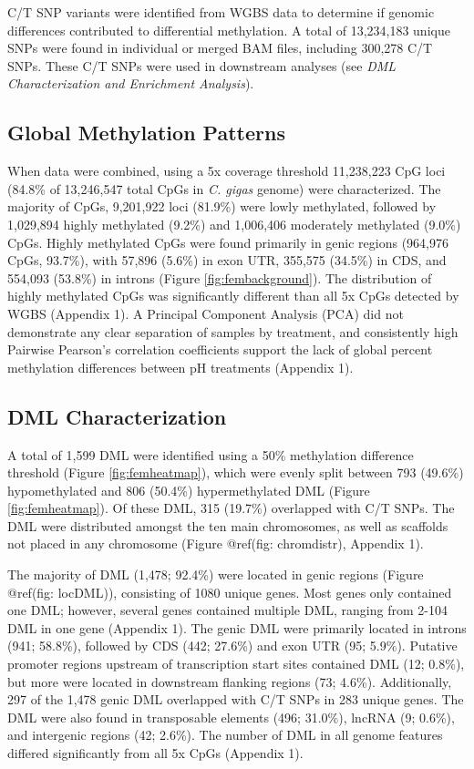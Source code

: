 \documentclass [11pt, proquest] {uwthesis}[2015/03/03]
\begin{document}
C/T SNP variants were identified from WGBS data to determine if genomic differences contributed to differential methylation. A total of 13,234,183 unique SNPs were found in individual or merged BAM files, including 300,278 C/T SNPs. These C/T SNPs were used in downstream analyses (see \emph{DML Characterization and Enrichment Analysis}).

\hypertarget{global-methylation-patterns}{%
\subsection{Global Methylation Patterns}\label{global-methylation-patterns}}

When data were combined, using a 5x coverage threshold 11,238,223 CpG loci (84.8\% of 13,246,547 total CpGs in \emph{C. gigas} genome) were characterized. The majority of CpGs, 9,201,922 loci (81.9\%) were lowly methylated, followed by 1,029,894 highly methylated (9.2\%) and 1,006,406 moderately methylated (9.0\%) CpGs. Highly methylated CpGs were found primarily in genic regions (964,976 CpGs, 93.7\%), with 57,896 (5.6\%) in exon UTR, 355,575 (34.5\%) in CDS, and 554,093 (53.8\%) in introns (Figure \ref{fig:fembackground}). The distribution of highly methylated CpGs was significantly different than all 5x CpGs detected by WGBS (Appendix 1). A Principal Component Analysis (PCA) did not demonstrate any clear separation of samples by treatment, and consistently high Pairwise Pearson's correlation coefficients support the lack of global percent methylation differences between pH treatments (Appendix 1).

\hypertarget{dml-characterization-1}{%
\subsection{DML Characterization}\label{dml-characterization-1}}

A total of 1,599 DML were identified using a 50\% methylation difference threshold (Figure \ref{fig:femheatmap}), which were evenly split between 793 (49.6\%) hypomethylated and 806 (50.4\%) hypermethylated DML (Figure \ref{fig:femheatmap}). Of these DML, 315 (19.7\%) overlapped with C/T SNPs. The DML were distributed amongst the ten main chromosomes, as well as scaffolds not placed in any chromosome (Figure @ref(fig: chromdistr), Appendix 1).

The majority of DML (1,478; 92.4\%) were located in genic regions (Figure @ref(fig: locDML)), consisting of 1080 unique genes. Most genes only contained one DML; however, several genes contained multiple DML, ranging from 2-104 DML in one gene (Appendix 1). The genic DML were primarily located in introns (941; 58.8\%), followed by CDS (442; 27.6\%) and exon UTR (95; 5.9\%). Putative promoter regions upstream of transcription start sites contained DML (12; 0.8\%), but more were located in downstream flanking regions (73; 4.6\%). Additionally, 297 of the 1,478 genic DML overlapped with C/T SNPs in 283 unique genes. The DML were also found in transposable elements (496; 31.0\%), lncRNA (9; 0.6\%), and intergenic regions (42; 2.6\%). The number of DML in all genome features differed significantly from all 5x CpGs (Appendix 1).
\end{document}
